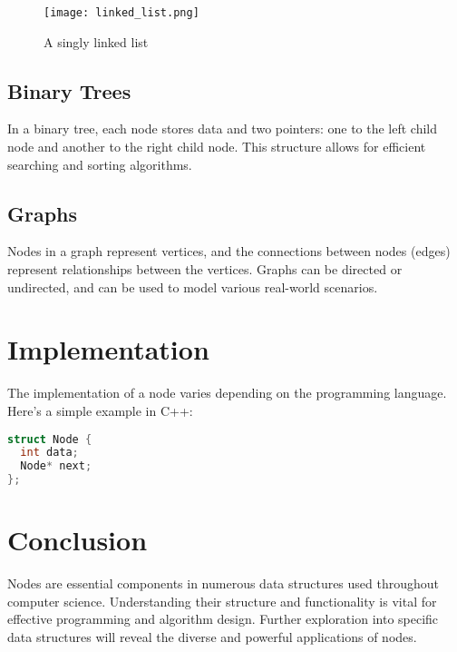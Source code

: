 \documentclass{article}
\begin{document}
\begin{figure}[h]
\centering
\texttt{[image: linked\_list.png]}  %
\caption{A singly linked list}
\label{fig:linked_list}
\end{figure}


\subsection{Binary Trees}

In a binary tree, each node stores data and two pointers: one to the left child node and another to the right child node.  This structure allows for efficient searching and sorting algorithms.


\subsection{Graphs}

Nodes in a graph represent vertices, and the connections between nodes (edges) represent relationships between the vertices.  Graphs can be directed or undirected, and can be used to model various real-world scenarios.

\section{Implementation}

The implementation of a node varies depending on the programming language.  Here's a simple example in C++:

\begin{lstlisting}[language=C++, caption=Node Implementation in C++, basicstyle=\ttfamily\footnotesize]
struct Node {
  int data;
  Node* next;
};
\end{lstlisting}


\section{Conclusion}

Nodes are essential components in numerous data structures used throughout computer science.  Understanding their structure and functionality is vital for effective programming and algorithm design.  Further exploration into specific data structures will reveal the diverse and powerful applications of nodes.
\end{document}
